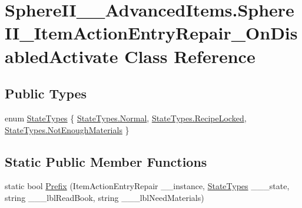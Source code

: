 \hypertarget{class_sphere_i_i_____advanced_items_1_1_sphere_i_i___item_action_entry_repair___on_disabled_activate}{}\section{Sphere\+I\+I\+\_\+\+\_\+\+Advanced\+Items.\+Sphere\+I\+I\+\_\+\+Item\+Action\+Entry\+Repair\+\_\+\+On\+Disabled\+Activate Class Reference}
\label{class_sphere_i_i_____advanced_items_1_1_sphere_i_i___item_action_entry_repair___on_disabled_activate}
\subsection*{Public Types}
\begin{DoxyCompactItemize}
\item 
enum \mbox{\hyperlink{class_sphere_i_i_____advanced_items_1_1_sphere_i_i___item_action_entry_repair___on_disabled_activate_a152c4b5cb32c084776f2539575c48ac4}{State\+Types}} \{ \mbox{\hyperlink{class_sphere_i_i_____advanced_items_1_1_sphere_i_i___item_action_entry_repair___on_disabled_activate_a152c4b5cb32c084776f2539575c48ac4a960b44c579bc2f6818d2daaf9e4c16f0}{State\+Types.\+Normal}}, 
\mbox{\hyperlink{class_sphere_i_i_____advanced_items_1_1_sphere_i_i___item_action_entry_repair___on_disabled_activate_a152c4b5cb32c084776f2539575c48ac4a54ca25072dd59279eca031993d480ca9}{State\+Types.\+Recipe\+Locked}}, 
\mbox{\hyperlink{class_sphere_i_i_____advanced_items_1_1_sphere_i_i___item_action_entry_repair___on_disabled_activate_a152c4b5cb32c084776f2539575c48ac4a786a9cc39a48f9896675c1b289f2bf2d}{State\+Types.\+Not\+Enough\+Materials}}
 \}
\end{DoxyCompactItemize}
\subsection*{Static Public Member Functions}
\begin{DoxyCompactItemize}
\item 
static bool \mbox{\hyperlink{class_sphere_i_i_____advanced_items_1_1_sphere_i_i___item_action_entry_repair___on_disabled_activate_a535205610eeae2d2e3594decce98e4bc}{Prefix}} (Item\+Action\+Entry\+Repair \+\_\+\+\_\+instance, \mbox{\hyperlink{class_sphere_i_i_____advanced_items_1_1_sphere_i_i___item_action_entry_repair___on_disabled_activate_a152c4b5cb32c084776f2539575c48ac4}{State\+Types}} \+\_\+\+\_\+\+\_\+state, string \+\_\+\+\_\+\+\_\+lbl\+Read\+Book, string \+\_\+\+\_\+\+\_\+lbl\+Need\+Materials)
\end{DoxyCompactItemize}


